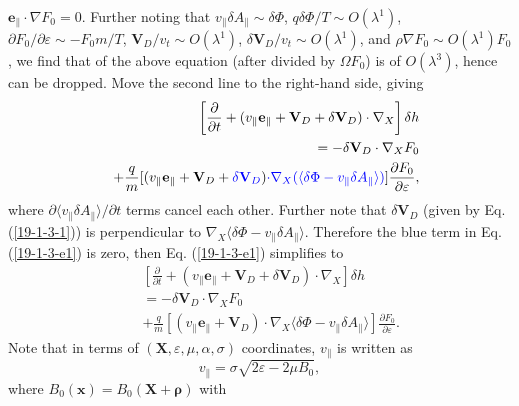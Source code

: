 \documentclass{llncs}
\newcommand{\tmcolor}[2]{{\color{#1}{#2}}}
\newcommand{\tmmathbf}[1]{\ensuremath{\boldsymbol{#1}}}
\begin{document}
$\mathbf{e}_{\parallel} \cdot \nabla F_0 = 0$. Further noting that
$v_{\parallel} \delta A_{\parallel} \sim \delta \Phi$, $q \delta \Phi / T \sim
O (\lambda^1)$, $\partial F_0 / \partial \varepsilon \sim - F_0 m / T$,
\quad$\mathbf{V}_D / v_t \sim O (\lambda^1)$, $\delta \mathbf{V}_D / v_t \sim
O (\lambda^1)$, and $\rho \nabla F_0 \sim O (\lambda^1) F_0$, we find that
\tmcolor{red}{the red term} of the above equation (after divided by $\Omega
F_0$) is of $O (\lambda^3)$, hence can be dropped. Move the second line to the
right-hand side, giving
\begin{eqnarray}
  &  & \left[ \frac{\partial}{\partial t} + (v_{\parallel}
  \mathbf{e}_{\parallel} +\mathbf{V}_D + \delta \mathbf{V}_D) \cdot \nabla_X
  \right] \delta h \nonumber\\
  &  & = - \delta \mathbf{V}_D \cdot \nabla_X F_0 \nonumber\\
  &  & + \frac{q}{m} [(v_{\parallel} \mathbf{e}_{\parallel} +\mathbf{V}_D +
  \tmcolor{blue}{\delta \mathbf{V}_D}) \tmcolor{blue}{\cdot \nabla_X (\langle
  \delta \Phi - v_{\parallel} \delta A_{\parallel} \rangle)}] \frac{\partial
  F_0}{\partial \varepsilon},  \label{19-1-3-e1}
\end{eqnarray}
where $\partial \langle v_{\parallel} \delta A_{\parallel} \rangle / \partial
t$ terms cancel each other. Further note that $\delta \mathbf{V}_D$ (given by
Eq. (\ref{19-1-3-1})) is perpendicular to $\nabla_X \langle \delta \Phi -
v_{\parallel} \delta A_{\parallel} \rangle$. Therefore the blue term in Eq.
(\ref{19-1-3-e1}) is zero, then Eq. (\ref{19-1-3-e1}) simplifies to
\begin{eqnarray}
  &  & \left[ \frac{\partial}{\partial t} + (v_{\parallel}
  \mathbf{e}_{\parallel} +\mathbf{V}_D + \delta \mathbf{V}_D) \cdot \nabla_X
  \right] \delta h \nonumber\\
  &  & = - \delta \mathbf{V}_D \cdot \nabla_X F_0 \nonumber\\
  &  & + \frac{q}{m} [(v_{\parallel} \mathbf{e}_{\parallel} +\mathbf{V}_D)
  \cdot \nabla_X \langle \delta \Phi - v_{\parallel} \delta A_{\parallel}
  \rangle] \frac{\partial F_0}{\partial \varepsilon} .  \label{19-1-4-e1}
\end{eqnarray}
Note that in terms of $(\mathbf{X}, \varepsilon, \mu, \alpha, \sigma)$
coordinates, $v_{\parallel}$ is written as
\begin{equation}
  \label{19-3-27-1} v_{\parallel} = \sigma \sqrt{2 \varepsilon - 2 \mu B_0},
\end{equation}
where $B_0 (\mathbf{x}) = B_0 (\mathbf{X}+\tmmathbf{\rho})$ with
\end{document}
